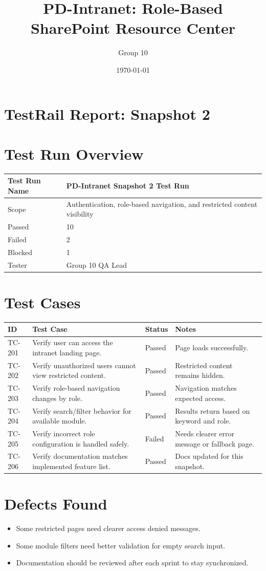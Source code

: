 \documentclass[12pt]{article}
\title{PD-Intranet: Role-Based SharePoint Resource Center}
\author{Group 10}
\date{\today}
\begin{document}
\maketitle
\tableofcontents
\newpage

\section{TestRail Report: Snapshot 2}
\section{Test Run Overview}
\begin{longtable}{|p{2in}|p{4in}|}\hline
Test Run Name & PD-Intranet Snapshot 2 Test Run \\ \hline
Scope & Authentication, role-based navigation, and restricted content visibility \\ \hline
Passed & 10 \\ \hline
Failed & 2 \\ \hline
Blocked & 1 \\ \hline
Tester & Group 10 QA Lead \\ \hline
\end{longtable}

\section{Test Cases}
\begin{longtable}{|p{.8in}|p{2.2in}|p{1in}|p{2in}|}\hline
ID & Test Case & Status & Notes \\ \hline
TC-201 & Verify user can access the intranet landing page. & Passed & Page loads successfully. \\ \hline
TC-202 & Verify unauthorized users cannot view restricted content. & Passed & Restricted content remains hidden. \\ \hline
TC-203 & Verify role-based navigation changes by role. & Passed & Navigation matches expected access. \\ \hline
TC-204 & Verify search/filter behavior for available module. & Passed & Results return based on keyword and role. \\ \hline
TC-205 & Verify incorrect role configuration is handled safely. & Failed & Needs clearer error message or fallback page. \\ \hline
TC-206 & Verify documentation matches implemented feature list. & Passed & Docs updated for this snapshot. \\ \hline
\end{longtable}

\section{Defects Found}
\begin{itemize}
\item Some restricted pages need clearer access denied messages.
\item Some module filters need better validation for empty search input.
\item Documentation should be reviewed after each sprint to stay synchronized.
\end{itemize}
\end{document}
